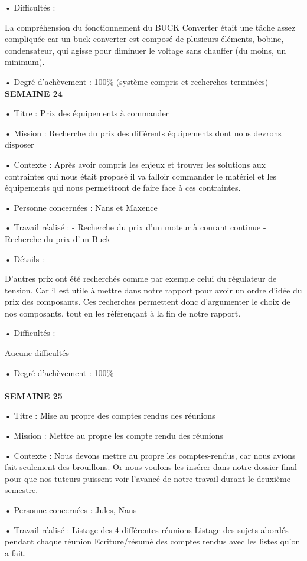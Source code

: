 \documentclass{PackagerQualityN}
\begin{document}
• Difficultés :

La compréhension du fonctionnement du BUCK Converter était une tâche assez compliquée car un buck converter est composé de plusieurs éléments, bobine, condensateur, qui agisse pour diminuer le voltage sans chauffer (du moins, un minimum).


• Degré d’achèvement : 100\% (système compris et recherches terminées)
\newp
\textbf{SEMAINE 24}

• Titre : Prix des équipements à commander

• Mission : Recherche du prix des différents équipements dont nous devrons disposer 

• Contexte : Après avoir compris les enjeux et trouver les solutions aux contraintes qui nous était proposé il va falloir commander le matériel et les équipements qui nous permettront de faire face à ces contraintes.

• Personne concernées : Nans et Maxence

• Travail réalisé :
- Recherche du prix d’un moteur à courant continue 
- Recherche du prix d’un Buck

• Détails : 

D’autres prix ont été recherchés comme par exemple celui du régulateur de tension. Car il est utile à mettre dans notre rapport pour avoir un ordre d’idée du prix des composants.
Ces recherches permettent donc d’argumenter le choix de nos composants, tout en les référençant à la fin de notre rapport.

• Difficultés :

Aucune difficultés


• Degré d’achèvement : 100\% 
\\\\
\textbf{SEMAINE 25}

• Titre : Mise au propre des comptes rendus des réunions

• Mission : Mettre au propre les compte rendu des réunions 

• Contexte : Nous devons mettre au propre les comptes-rendus, car nous avions fait seulement des brouillons. Or nous voulons les insérer dans notre dossier final pour que nos tuteurs puissent voir l’avancé de notre travail durant le deuxième semestre.

• Personne concernées : Jules, Nans

• Travail réalisé :
Listage des 4 différentes réunions
Listage des sujets abordés pendant chaque réunion
Ecriture/résumé des comptes rendus avec les listes qu’on a fait.
\end{document}
